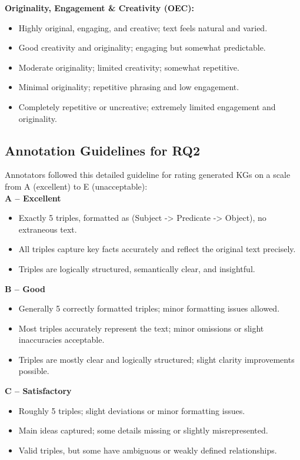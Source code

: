 \documentclass[11pt]{article}
\begin{document}
\noindent\textbf{Originality, Engagement \& Creativity (OEC):}
\begin{itemize}
\item[A:] Highly original, engaging, and creative; text feels natural and varied.
\item[B:] Good creativity and originality; engaging but somewhat predictable.
\item[C:] Moderate originality; limited creativity; somewhat repetitive.
\item[D:] Minimal originality; repetitive phrasing and low engagement.
\item[E:] Completely repetitive or uncreative; extremely limited engagement and originality.
\end{itemize}





\subsection{Annotation Guidelines for RQ2}\label{appendix:guidelines2}

Annotators followed this detailed guideline for rating generated KGs on a scale from A (excellent) to E (unacceptable):\\

\noindent\textbf{A – Excellent}
\begin{itemize}
\item Exactly 5 triples, formatted as (Subject -> Predicate -> Object), no extraneous text.
\item All triples capture key facts accurately and reflect the original text precisely.
\item Triples are logically structured, semantically clear, and insightful.
\end{itemize}

\noindent\textbf{B – Good}
\begin{itemize}
\item Generally 5 correctly formatted triples; minor formatting issues allowed.
\item Most triples accurately represent the text; minor omissions or slight inaccuracies acceptable.
\item Triples are mostly clear and logically structured; slight clarity improvements possible.
\end{itemize}

\noindent\textbf{C – Satisfactory}
\begin{itemize}
\item Roughly 5 triples; slight deviations or minor formatting issues.
\item Main ideas captured; some details missing or slightly misrepresented.
\item Valid triples, but some have ambiguous or weakly defined relationships.
\end{itemize}
\end{document}
